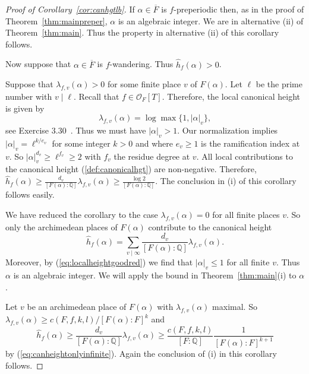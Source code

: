 \documentclass[12pt,oneside,a4]{amsart}
\newcommand{\IQ}{\mathbb{Q}}
\newcommand{\cO}{\mathcal{O}}
\numberwithin{maincounter}{section}
\numberwithin{equation}{section}
\begin{document}
\begin{proof}[Proof of Corollary~\ref{cor:canhgtlb}]
  If $\alpha\in \overline F$ is $f$-preperiodic then, as in the proof
  of Theorem~\ref{thm:mainpreper},  $\alpha$ is
  an algebraic integer. We are in alternative (ii) of
  Theorem~\ref{thm:main}. Thus the property in alternative (ii) of
  this  corollary follows.
  
  Now suppose  that $\alpha\in \overline F$ is $f$-wandering.
  Thus
  $\hat h_f(\alpha)>0$.
  
  Suppose that $\lambda_{f,v}(\alpha)>0$ for some finite place
  $v$ of $F(\alpha)$. Let $\ell$ be the  prime
  number with $v\mid \ell$. 
  Recall that $f\in\cO_F[T]$. Therefore, the
  local canonical height is given by
  \begin{equation}
    \label{eq:localheightgoodred}
    \lambda_{f,v}(\alpha) = \log\max\{1,|\alpha|_v\},
  \end{equation}
  see Exercise 3.30~\cite{Silverman:gtm241}. Thus we must have $|\alpha|_v>1$. Our
  normalization implies $|\alpha|_v = \ell^{k/e_v}$ for some integer $k>0$
  and where $e_v\ge 1$ is the ramification index at $v$.
  So $|\alpha|_v^{d_v}\ge \ell^{f_v}\ge 2$ with $f_v$ the residue
  degree at $v$.
  All local contributions to the canonical height
  (\ref{def:canonicalhgt})
  are non-negative.
  Therefore, 
  $\hat h_f(\alpha)\ge \frac{d_v}{[F(\alpha):\IQ]}\lambda_{f,v}(\alpha)\ge \frac{\log
    2}{[F(\alpha):\IQ]}$. The conclusion in (i) of this  corollary follows easily. 

  We have reduced the corollary to the case $\lambda_{f,v}(\alpha)=0$ for
  all finite places $v$. So only the archimedean places of $F(\alpha)$
  contribute to the canonical height
  \begin{equation}
    \label{eq:canheightonlyinfinite}
    \hat h_f(\alpha) = \sum_{v\mid\infty} \frac{d_v}{[F(\alpha):\IQ]}\lambda_{f,v}(\alpha).
  \end{equation}
  Moreover, by (\ref{eq:localheightgoodred}) we find that $|\alpha|_v\le 1$ for all finite $v$.
  Thus $\alpha$ is an algebraic integer. We will apply the bound in
  Theorem~\ref{thm:main}(i) to $\alpha$. 
  
  Let $v$ be an archimedean place of $F(\alpha)$ with
  $\lambda_{f,v}(\alpha)$ maximal. 
  So
  $\lambda_{f,v}(\alpha)\ge c(F,f,k,l)/[F(\alpha):F]^{k}$  
  and 
  \begin{equation*}
    \hat h_{f}(\alpha) \ge
    \frac{d_v }{[F(\alpha):\IQ]}\lambda_{f,v}(\alpha)
    \ge \frac{c(F,f,k,l)}{[F:\IQ]}\frac{1}{[F(\alpha):F]^{k+1}} 
  \end{equation*}
  by (\ref{eq:canheightonlyinfinite}).
  Again the conclusion of (i) in this corollary follows. 
\end{proof}
\end{document}
